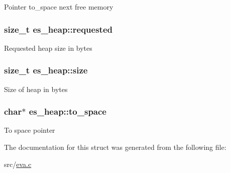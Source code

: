 Pointer to\-\_\-space next free memory \hypertarget{structes__heap_aeeee0615c3497b7585bd81c0e6aee20d}{
\subsubsection[{requested}]{\setlength{\rightskip}{0pt plus 5cm}size\-\_\-t es\-\_\-heap\-::requested}}\label{structes__heap_aeeee0615c3497b7585bd81c0e6aee20d}
Requested heap size in bytes \hypertarget{structes__heap_a4483c0fcc97496abd40b2dfa8bcd5d8c}{
\subsubsection[{size}]{\setlength{\rightskip}{0pt plus 5cm}size\-\_\-t es\-\_\-heap\-::size}}\label{structes__heap_a4483c0fcc97496abd40b2dfa8bcd5d8c}
Size of heap in bytes \hypertarget{structes__heap_ae0591495c28dd8f63b335a0477dc46ad}{
\subsubsection[{to\-\_\-space}]{\setlength{\rightskip}{0pt plus 5cm}char$\ast$ es\-\_\-heap\-::to\-\_\-space}}\label{structes__heap_ae0591495c28dd8f63b335a0477dc46ad}
To space pointer 

The documentation for this struct was generated from the following file\-:\begin{DoxyCompactItemize}
\item 
src/\hyperlink{eva_8c}{eva.\-c}\end{DoxyCompactItemize}
